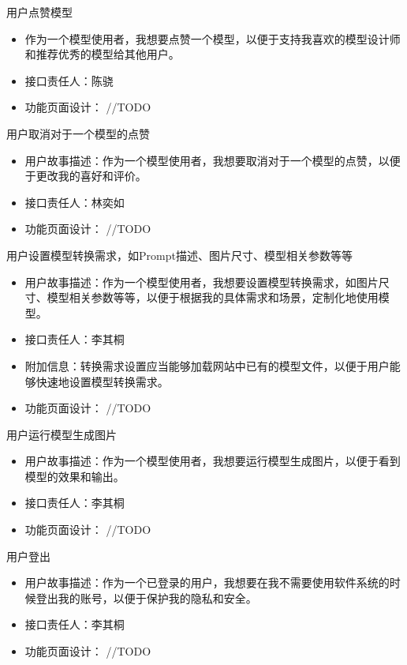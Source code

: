 \begin{frame}{用户点赞模型}
    \begin{itemize}
        \item 作为一个模型使用者，我想要点赞一个模型，以便于支持我喜欢的模型设计师和推荐优秀的模型给其他用户。
        \item 接口责任人：陈骁
        \item 功能页面设计： //TODO
    \end{itemize}
\end{frame}

\begin{frame}{用户取消对于一个模型的点赞}
    \begin{itemize}
        \item 用户故事描述：作为一个模型使用者，我想要取消对于一个模型的点赞，以便于更改我的喜好和评价。
        \item 接口责任人：林奕如
        \item 功能页面设计： //TODO
    \end{itemize}
\end{frame}

\begin{frame}{用户设置模型转换需求，如Prompt描述、图片尺寸、模型相关参数等等}
    \begin{itemize}
        \item 用户故事描述：作为一个模型使用者，我想要设置模型转换需求，如图片尺寸、模型相关参数等等，以便于根据我的具体需求和场景，定制化地使用模型。
        \item 接口责任人：李其桐
        \item 附加信息：转换需求设置应当能够加载网站中已有的模型文件，以便于用户能够快速地设置模型转换需求。
        \item 功能页面设计： //TODO
    \end{itemize}
\end{frame}

\begin{frame}{用户运行模型生成图片}
    \begin{itemize}
        \item 用户故事描述：作为一个模型使用者，我想要运行模型生成图片，以便于看到模型的效果和输出。
        \item 接口责任人：李其桐
        \item 功能页面设计： //TODO
    \end{itemize}
\end{frame}

\begin{frame}{用户登出}
    \begin{itemize}
        \item 用户故事描述：作为一个已登录的用户，我想要在我不需要使用软件系统的时候登出我的账号，以便于保护我的隐私和安全。
        \item 接口责任人：李其桐
        \item 功能页面设计： //TODO
    \end{itemize}
\end{frame}
